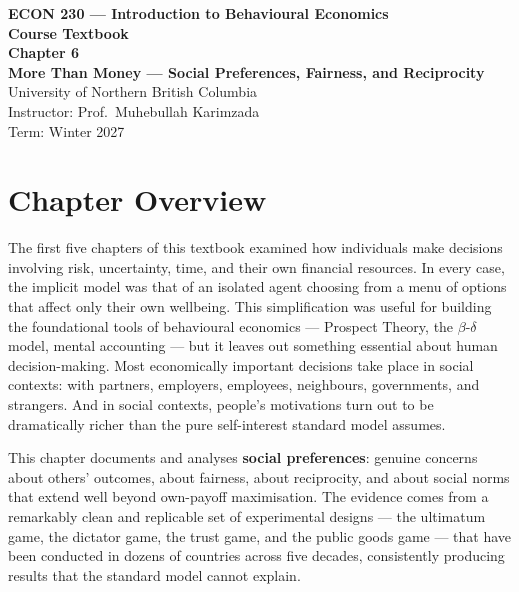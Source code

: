 \documentclass[12pt, letterpaper]{article}
\begin{document}
\begin{titlepage}
\centering\vspace*{3cm}
{\Large\bfseries\color{econblue} ECON 230 --- Introduction to Behavioural Economics\\[1em]}
{\large\bfseries Course Textbook\\[2em]}
{\LARGE\bfseries\color{econblue} Chapter 6\\[0.5em]}
{\Large\bfseries More Than Money --- Social Preferences, Fairness, and Reciprocity\\[2em]}
\vfill
{\normalsize University of Northern British Columbia\\
Instructor: Prof.\ Muhebullah Karimzada\\
Term: Winter 2027}
\end{titlepage}
\tableofcontents
\newpage


\medskip


\section*{Chapter Overview}


The first five chapters of this textbook examined how individuals make decisions involving risk, uncertainty, time, and their own financial resources. In every case, the implicit model was that of an isolated agent choosing from a menu of options that affect only their own wellbeing. This simplification was useful for building the foundational tools of behavioural economics --- Prospect Theory, the $\beta$-$\delta$ model, mental accounting --- but it leaves out something essential about human decision-making. Most economically important decisions take place in social contexts: with partners, employers, employees, neighbours, governments, and strangers. And in social contexts, people's motivations turn out to be dramatically richer than the pure self-interest standard model assumes.

This chapter documents and analyses \textbf{social preferences}: genuine concerns about others' outcomes, about fairness, about reciprocity, and about social norms that extend well beyond own-payoff maximisation. The evidence comes from a remarkably clean and replicable set of experimental designs --- the ultimatum game, the dictator game, the trust game, and the public goods game --- that have been conducted in dozens of countries across five decades, consistently producing results that the standard model cannot explain.
\end{document}
